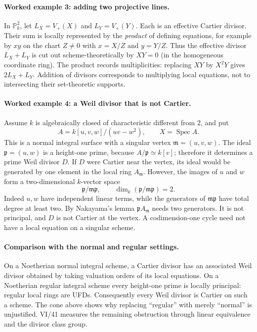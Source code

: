 \paragraph{Worked example 3: adding two projective lines.}
In $\mathbb P_k^2$, let $L_X=V_+(X)$ and $L_Y=V_+(Y)$.
Each is an effective Cartier divisor.  Their sum is locally
represented by the \emph{product} of defining equations, for example
by $xy$ on the chart $Z\ne0$ with $x=X/Z$ and $y=Y/Z$.
Thus the effective divisor $L_X+L_Y$ is cut out scheme-theoretically
by $XY=0$ (in the homogeneous coordinate ring).  The product
records multiplicities: replacing $XY$ by $X^2Y$ gives
$2L_X+L_Y$.  Addition of divisors corresponds to multiplying
local equations, not to intersecting their set-theoretic supports.

\paragraph{Worked example 4: a Weil divisor that is not Cartier.}
Assume $k$ is algebraically closed of characteristic different from
$2$, and put
\[
 A=k[u,v,w]/(uv-w^2),\qquad X=\operatorname{Spec}A.
\]
This is a normal integral surface with a singular vertex
$\mathfrak m=(u,v,w)$.  The ideal $\mathfrak p=(u,w)$ is a
height-one prime, because $A/\mathfrak p\simeq k[v]$;
therefore it determines a prime Weil divisor $D$.
If $D$ were Cartier near the vertex, its ideal would be generated
by one element in the local ring $A_{\mathfrak m}$.
However, the images of $u$ and $w$ form a two-dimensional
$k$-vector space
\[
 \mathfrak p/\mathfrak m\mathfrak p,
 \qquad \dim_k(\mathfrak p/\mathfrak m\mathfrak p)=2.
\]
Indeed $u,w$ have independent linear terms, while the generators
of $\mathfrak m\mathfrak p$ have total degree at least two.
By Nakayama's lemma $\mathfrak pA_{\mathfrak m}$ needs two
generators.  It is not principal, and $D$ is not Cartier at the
vertex.  A codimension-one cycle need not have a local equation
on a singular scheme.

\paragraph{Comparison with the normal and regular settings.}
On a Noetherian normal integral scheme, a Cartier divisor has an
associated Weil divisor obtained by taking valuation orders of its
local equations.  On a Noetherian regular integral scheme every
height-one prime is locally principal: regular local rings are UFDs.
Consequently every Weil divisor is Cartier on such a scheme.
The cone above shows why replacing ``regular'' with merely ``normal''
is unjustified.  VI/41 measures the remaining obstruction through
linear equivalence and the divisor class group.
